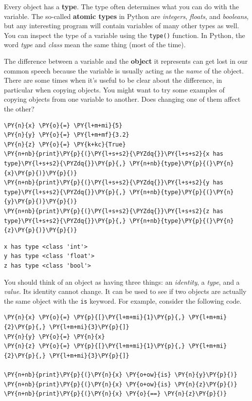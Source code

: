 Every object has a \textbf{type}.  The type often determines what you can do with the variable.  The so-called \textbf{atomic types} in Python are \emph{integers}, \emph{floats}, and \emph{booleans}, but any interesting program will contain variables of many other types as well.  You can inspect the type of a variable using the \texttt{type()} function.  In Python, the word \emph{type} and \emph{class} mean the same thing (most of the time).


The difference between a variable and the \textbf{object} it represents can get lost in our common speech because the variable is usually acting as the \emph{name} of the object.  There are some times when it's useful to be clear about the difference, in particular when copying objects.  You might want to try some examples of copying objects from one variable to another.  Does changing one of them affect the other?


\begin{Verbatim}[commandchars=\\\{\}]
\PY{n}{x} \PY{o}{=} \PY{l+m+mi}{5}
\PY{n}{y} \PY{o}{=} \PY{l+m+mf}{3.2}
\PY{n}{z} \PY{o}{=} \PY{k+kc}{True}
\PY{n+nb}{print}\PY{p}{(}\PY{l+s+s2}{\PYZdq{}}\PY{l+s+s2}{x has type}\PY{l+s+s2}{\PYZdq{}}\PY{p}{,} \PY{n+nb}{type}\PY{p}{(}\PY{n}{x}\PY{p}{)}\PY{p}{)}
\PY{n+nb}{print}\PY{p}{(}\PY{l+s+s2}{\PYZdq{}}\PY{l+s+s2}{y has type}\PY{l+s+s2}{\PYZdq{}}\PY{p}{,} \PY{n+nb}{type}\PY{p}{(}\PY{n}{y}\PY{p}{)}\PY{p}{)}
\PY{n+nb}{print}\PY{p}{(}\PY{l+s+s2}{\PYZdq{}}\PY{l+s+s2}{z has type}\PY{l+s+s2}{\PYZdq{}}\PY{p}{,} \PY{n+nb}{type}\PY{p}{(}\PY{n}{z}\PY{p}{)}\PY{p}{)}
\end{Verbatim}

\begin{Verbatim}
x has type <class 'int'>
y has type <class 'float'>
z has type <class 'bool'>

\end{Verbatim}


You should think of an object as having three things: an \emph{identity}, a \emph{type}, and a \emph{value}.
Its identity cannot change.  It can be used to see if two objects are actually the same object with the \texttt{is} keyword.
For example, consider the following code.


\begin{Verbatim}[commandchars=\\\{\}]
\PY{n}{x} \PY{o}{=} \PY{p}{[}\PY{l+m+mi}{1}\PY{p}{,} \PY{l+m+mi}{2}\PY{p}{,} \PY{l+m+mi}{3}\PY{p}{]}
\PY{n}{y} \PY{o}{=} \PY{n}{x}
\PY{n}{z} \PY{o}{=} \PY{p}{[}\PY{l+m+mi}{1}\PY{p}{,} \PY{l+m+mi}{2}\PY{p}{,} \PY{l+m+mi}{3}\PY{p}{]}

\PY{n+nb}{print}\PY{p}{(}\PY{n}{x} \PY{o+ow}{is} \PY{n}{y}\PY{p}{)}
\PY{n+nb}{print}\PY{p}{(}\PY{n}{x} \PY{o+ow}{is} \PY{n}{z}\PY{p}{)}
\PY{n+nb}{print}\PY{p}{(}\PY{n}{x} \PY{o}{==} \PY{n}{z}\PY{p}{)}
\end{Verbatim}

